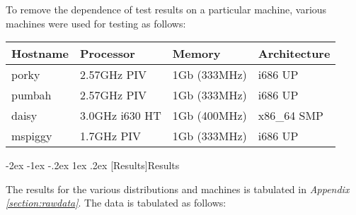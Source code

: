 \documentclass[letterpaper,final,notitlepage,twocolumn,10pt,twoside]{article}
\makeatletter
\renewcommand\section{\@startsection {section}{1}{\z@}%
                                   {-2ex \@plus -1ex \@minus -.2ex}%
                                   {1ex \@plus .2ex}%
                                   {\normalfont\large\bfseries}}
\makeatother
\begin{document}
To remove the dependence of test results on a particular machine, various
machines were used for testing as follows:

\footnotesize
\begin{tabular}{llll}\\
Hostname & Processor & Memory & Architecture\\
\hline
porky & 2.57GHz PIV & 1Gb (333MHz) & i686 UP\\
pumbah & 2.57GHz PIV & 1Gb (333MHz) & i686 UP\\
daisy & 3.0GHz i630 HT & 1Gb (400MHz) & x86\_64 SMP\\
mspiggy & 1.7GHz PIV & 1Gb (333MHz) & i686 UP\\
\end{tabular}
\normalsize

\section[Results]{Results}

The results for the various distributions and machines is tabulated in
\textit{Appendix \ref{section:rawdata}}.  The data is tabulated as follows:
\end{document}
